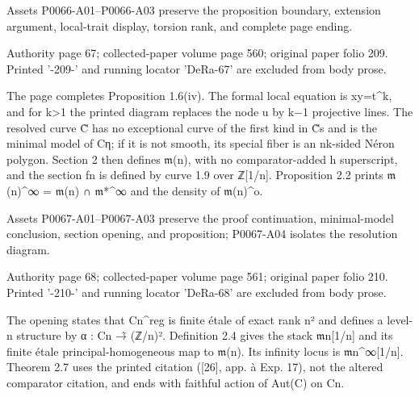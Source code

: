 \documentclass[11pt,a4paper]{article}
\begin{document}
Assets P0066-A01--P0066-A03 preserve the proposition boundary, extension argument, local-trait display, torsion rank, and complete page ending.


\par\medskip
\hypertarget{D018-P0067}{}
\par\smallskip
Authority page 67; collected-paper volume page 560; original paper folio 209. Printed '-209-' and running locator 'DeRa-67' are excluded from body prose.

The page completes Proposition 1.6(iv). The formal local equation is xy=t\textasciicircum{}k, and for k>1 the printed diagram replaces the node u by k−1 projective lines. The resolved curve C̃ has no exceptional curve of the first kind in C̃\textunderscore{}s and is the minimal model of C\textunderscore{}η; if it is not smooth, its special fiber is an nk-sided Néron polygon. Section 2 then defines \ensuremath{\mathfrak{m}}\textunderscore{}(n), with no comparator-added h superscript, and the section f\textunderscore{}n is defined by curve 1.9 over ℤ[1/n]. Proposition 2.2 prints \ensuremath{\mathfrak{m}}\textunderscore{}(n)\textasciicircum{}∞ = \ensuremath{\mathfrak{m}}\textunderscore{}(n) ∩ \ensuremath{\mathfrak{m}}\textunderscore{}*\textasciicircum{}∞ and the density of \ensuremath{\mathfrak{m}}\textunderscore{}(n)\textasciicircum{}o.

Assets P0067-A01--P0067-A03 preserve the proof continuation, minimal-model conclusion, section opening, and proposition; P0067-A04 isolates the resolution diagram.


\par\medskip
\hypertarget{D018-P0068}{}
\par\smallskip
Authority page 68; collected-paper volume page 561; original paper folio 210. Printed '-210-' and running locator 'DeRa-68' are excluded from body prose.

The opening states that C\textunderscore{}n\textasciicircum{}reg is finite étale of exact rank n² and defines a level-n structure by α : C\textunderscore{}n →̃ (ℤ/n)². Definition 2.4 gives the stack \ensuremath{\mathfrak{m}}\textunderscore{}n[1/n] and its finite étale principal-homogeneous map to \ensuremath{\mathfrak{m}}\textunderscore{}(n). Its infinity locus is \ensuremath{\mathfrak{m}}\textunderscore{}n\textasciicircum{}∞[1/n]. Theorem 2.7 uses the printed citation ([26], app. à Exp. 17), not the altered comparator citation, and ends with faithful action of Aut(C) on C\textunderscore{}n.
\end{document}
